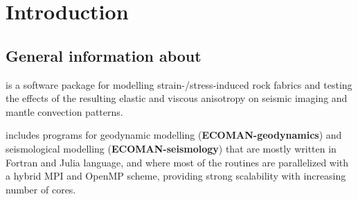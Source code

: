 \chapter{Introduction}
\label{chapter:introduction}

\section{General information about \thesistitle}

\thesistitle{} is a software package for modelling strain-/stress-induced rock fabrics and testing the effects of the resulting elastic and viscous anisotropy on seismic imaging and mantle convection patterns. 

\thesistitle{} includes programs for geodynamic modelling (\textbf{ECOMAN-geodynamics}) and seismological modelling (\textbf{ECOMAN-seismology}) that are mostly written in Fortran and Julia language, and where most of the routines are parallelized with a hybrid MPI and OpenMP scheme, providing strong scalability with increasing number of cores.

